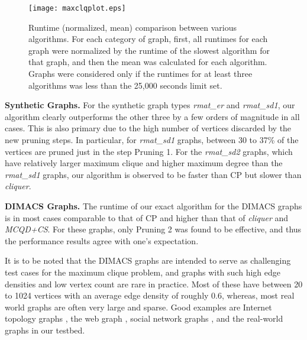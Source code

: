 \begin{figure}
  \centering
    \texttt{[image: maxclqplot.eps]}
  \caption{Runtime (normalized, mean) comparison between various algorithms. For each category of graph, first, all runtimes for each graph were normalized by the runtime of the slowest algorithm for that graph, and then the mean was calculated for each algorithm. Graphs were considered only if the runtimes for at least three algorithms was less than the 25,000 seconds limit set.}
\label{fig-timeplot}
\end{figure}



{\bf Synthetic Graphs. }
For the synthetic graph types {\it rmat\_er} and {\it rmat\_sd1}, our algorithm clearly outperforms 
the other three by a few orders of magnitude in all cases. 
This is also primary due to the high number of vertices discarded by the new pruning steps. 
In particular, for {\it rmat\_sd1} graphs, between 30 to 37\% of the vertices are pruned just in the step Pruning 1. 
For the {\it rmat\_sd2} graphs, which have relatively larger maximum clique and higher maximum degree than the {\it rmat\_sd1} graphs, our algorithm is observed to be faster than 
CP but slower than {\em cliquer}. 

{\bf DIMACS Graphs. }
The runtime of our exact algorithm for the DIMACS graphs is 
in most cases comparable to that of CP and higher than that of {\it cliquer}
and {\it MCQD+CS}.
For these graphs, only Pruning 2 was found to be effective, 
and thus the performance results agree with one's expectation. 

It is to be noted that the DIMACS graphs are intended to serve as challenging test cases for the maximum clique problem, and graphs with such high edge densities and low vertex count are rare in practice. 
Most of these have between 20 to 1024 vertices with an average edge density of roughly 0.6, 
whereas, most real world graphs are often very large and sparse. Good examples are Internet topology graphs \cite{Faloutsos:1999:PRI:316188.316229}, the web graph \cite{kumar:extracting}, social network graphs \cite{Domingos:2001:MNV:502512.502525}, and the real-world graphs in our testbed. 

